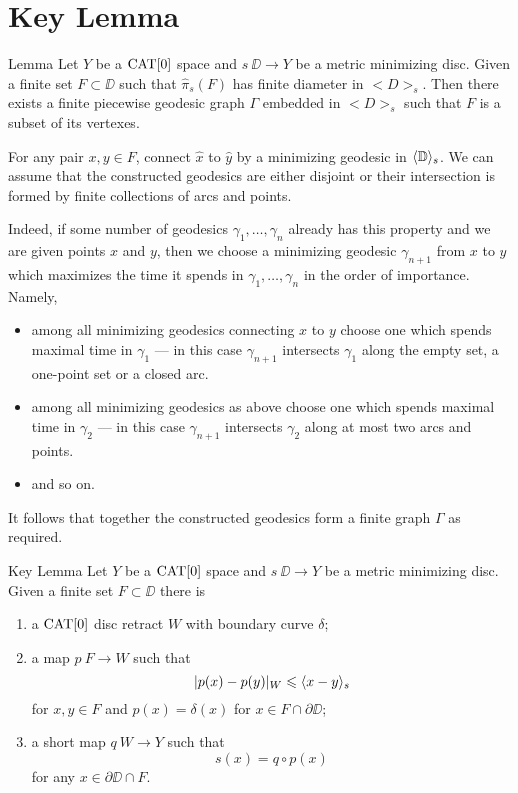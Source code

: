 \section{Key Lemma}\label{Key Lemma}


\begin{thm}{Lemma}\label{lem:graph}
Let $Y$ be a $\mathop{\rm CAT}\nolimits[0]$ space and $s\:\DD\to Y$ 
be a metric minimizing disc.
Given a finite set $F\subset \DD$ such that $\hat\pi_s(F)$ has finite
diameter in $<D>_s$. Then
there exists a finite piecewise geodesic graph $\Gamma$ embedded in $<D>_s$ such that 
$F$ is a subset of its vertexes.
\end{thm} 

For any pair $x,y\in F$, connect $\hat x$ to $\hat y$ by a minimizing geodesic in $\langle\mathbb{D}\rangle_s$. 
We can assume that the constructed geodesics 
are either disjoint or their intersection is formed by finite collections of arcs and points.

Indeed, if some number of geodesics $\gamma_1,\dots,\gamma_n$ already has this property and we are given points $x$ and $y$, then
we choose a minimizing geodesic $\gamma_{n+1}$ from $x$ to $y$ which maximizes the time it spends in $\gamma_1,\dots,\gamma_n$  
in the order of importance.
Namely, 
\begin{itemize}
\item  among all minimizing geodesics connecting $x$ to $y$
choose one which spends maximal time in $\gamma_1$ --- in this case $\gamma_{n+1}$ intersects $\gamma_1$ along the empty set, 
a one-point set or a closed arc.
\item among all minimizing geodesics as above
choose one which spends maximal time in $\gamma_2$ --- in this case $\gamma_{n+1}$ intersects $\gamma_2$ along at most two arcs and points.
\item and so on.
\end{itemize}


It follows that together the constructed geodesics form a finite graph $\Gamma$ as required.
\qeds



\begin{thm}{Key Lemma}\label{lem:key}
Let $Y$ be a $\mathop{\rm CAT}\nolimits[0]$ space and $s\:\DD\to Y$ 
be a metric minimizing disc.
Given a finite set $F\subset \DD$
there is 
\begin{enumerate}[(1.)]
	\item a $\mathop{\rm CAT}\nolimits[0]$ disc retract $W$ with boundary curve $\delta$;
	\item a map $p\:F\to W$ such that
\[|p(x)-p(y)|_W\leqslant \langle x-y\rangle_s\] 
for $x,y\in F$ and $p(x)=\delta(x)$ for $x\in F\cap \partial\DD$;
  \item a short map $q\:W\to Y$ such that
\[s(x)=q\circ p(x)\] 
for any $x\in\partial\DD\cap F$.
\end{enumerate}
 
\end{thm} 


